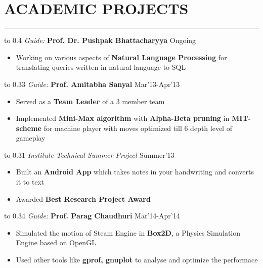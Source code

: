 \documentclass[11pt]{book} %
\begin{document}
\section*{ACADEMIC PROJECTS}
\vspace{-2mm}
\hrule
\medskip

\noindent\hbox to 0.4 \hfill \textit{Guide:} \textbf{Prof. Dr. Pushpak Bhattacharyya} \hfill Ongoing
\vspace{-3mm}
\begin{itemize}
\itemsep-0.3em
\item Working on various aspects of \textbf{Natural Language Processing} for translating queries written in natural language to SQL
\end{itemize}
\vspace{-1mm}

\noindent\hbox to 0.33 \hfill \textit{Guide:} \textbf{Prof. Amitabha Sanyal} \hfill Mar'13-Apr'13

\vspace{-3mm}
\begin{itemize}
\itemsep-0.3em
\item Served as a \textbf{Team Leader} of a 3 member team
\item Implemented \textbf{Mini-Max algorithm} with \textbf{Alpha-Beta pruning} in \textbf{MIT-scheme} for machine player with 
moves optimized till 6 depth level of gameplay
\end{itemize}
\vspace{-1mm}

\noindent\hbox to 0.31 \hfill \textit{Institute Technical Summer Project} \hfill Summer'13
\vspace{-3mm}
\begin{itemize}
\itemsep-0.3em
\item Built an \textbf{Android App} which takes notes in your handwriting and converts it to text
\item Awarded \textbf{Best Research Project Award}
\end{itemize}
\vspace{-1mm}

\noindent\hbox to 0.34 \hfill \textit{Guide:} \textbf{Prof. Parag Chaudhuri} \hfill Mar'14-Apr'14
\vspace{-3mm}
\begin{itemize}
\itemsep-0.3em
\item Simulated the motion of Steam Engine in \textbf{Box2D}, a Physics Simulation Engine based on OpenGL
\item Used other tools like \textbf{gprof, gnuplot} to analyse and optimize the performace
\end{itemize}
\vspace{-1mm}
\end{document}
